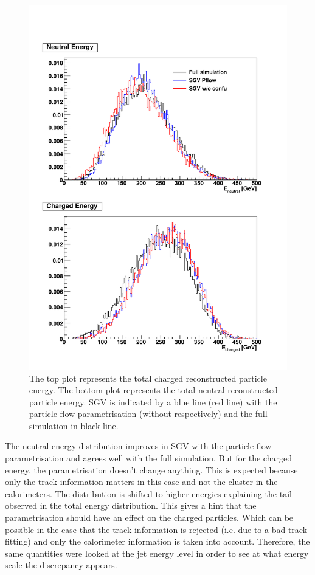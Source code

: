 \begin{figure}[htbp!]
  \centering
  \includegraphics[width=1\linewidth]{Appendixes/fig_SGV/Total_EneuEcha_notjet.pdf}
  \caption{The top plot represents the total charged reconstructed particle energy. The bottom plot represents the total neutral reconstructed particle energy. SGV is indicated by a blue line (red line) with the particle flow parametrisation (without respectively) and the full simulation in black line.}
  \label{fig:energy_charged_neutral}
\end{figure}

The neutral energy distribution improves in SGV with the particle flow parametrisation and agrees well with the full simulation. But for the charged energy, the parametrisation doesn't change anything. This is expected because only the track information matters in this case and not the cluster in the calorimeters. The distribution is shifted to higher energies explaining the tail observed in the total energy distribution. This gives a hint that the parametrisation should have an effect on the charged particles. Which can be possible in the case that the track information is rejected (i.e. due to a bad track fitting) and only the calorimeter information is taken into account. Therefore, the same quantities were looked at the jet energy level in order to see at what energy scale the discrepancy appears.

